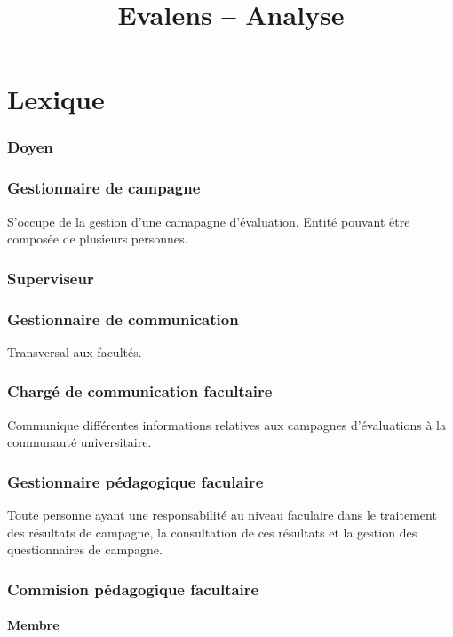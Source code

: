 \documentclass[a4paper,11pt]{report}
\title{Evalens -- Analyse}
\date{}
\begin{document}
\maketitle
\tableofcontents

\chapter{Lexique}

\subsection{Doyen}

\subsection{Gestionnaire de campagne}
S'occupe de la gestion d'une camapagne d'évaluation.
Entité pouvant être composée de plusieurs personnes.

\subsection{Superviseur}

\subsection{Gestionnaire de communication}
Transversal aux facultés.

\subsection{Chargé de communication facultaire}
Communique différentes informations relatives aux campagnes d'évaluations à la communauté universitaire.

\subsection{Gestionnaire pédagogique faculaire}
Toute personne ayant une responsabilité au niveau faculaire dans le traitement des résultats de campagne, la consultation de ces résultats et la gestion des questionnaires de campagne.

\subsection{Commision pédagogique facultaire}
\subsubsection{Membre}
\end{document}
